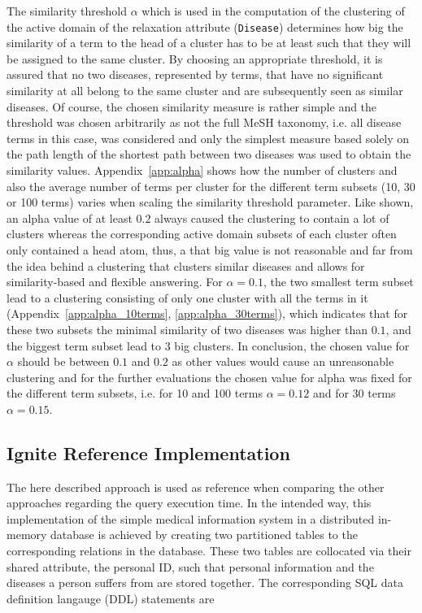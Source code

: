 The similarity threshold $\alpha$ which is used in the computation of the clustering of the active domain of the relaxation attribute (\verb!Disease!) 
determines how big the similarity of a term to the head of a cluster has to be at least such that they will be assigned to the same cluster. By choosing an
appropriate threshold, it is assured that no two diseases, represented by terms, that have no significant similarity at all belong to the same cluster and are 
subsequently seen as similar diseases. Of course, the chosen similarity measure is rather simple and the threshold was chosen arbitrarily as not the full
MeSH taxonomy, i.e. all disease terms in this case, was considered and only the simplest measure based solely on the path length of the shortest path between
two diseases was used to obtain the similarity values. Appendix~\ref{app:alpha} shows how the number of clusters and also the average number of terms per
cluster for the different term subsets (10, 30 or 100 terms) varies when scaling the similarity threshold parameter. Like shown, an alpha value of at least
$0.2$ always caused the clustering to contain a lot of clusters whereas the corresponding active domain subsets of each cluster often only contained a head
atom, thus, a that big value is not reasonable and far from the idea behind a clustering that clusters similar diseases and allows for similarity-based and
flexible answering. For $\alpha=0.1$, the two smallest term subset lead to a clustering consisting of only one cluster with all the terms in it 
(Appendix~\ref{app:alpha_10terms}, \ref{app:alpha_30terms}), which indicates that for these two subsets the minimal similarity of two diseases was higher than
$0.1$, and the biggest term subset lead to 3 big clusters. In conclusion, the chosen value for $\alpha$ should be between $0.1$ and $0.2$ as other values would
cause an unreasonable clustering and for the further evaluations the chosen value for alpha was fixed for the different term subsets, i.e. for 10 and 100 terms
$\alpha=0.12$ and for 30 terms $\alpha=0.15$.


\subsection{Ignite Reference Implementation}
\label{sec:impl_refimpl}
The here described approach is used as reference when comparing the other approaches regarding the query execution time. In the intended way, this
implementation of the simple medical information system in a distributed in-memory  database is achieved by creating two partitioned tables
to the corresponding relations in the database. These two tables are collocated via their shared attribute, the personal ID, such that personal information and
the diseases a person suffers from are stored together. The corresponding SQL data definition langauge (DDL) statements are

